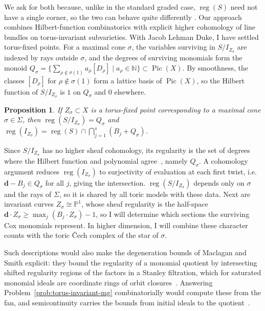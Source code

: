 \documentclass[11pt,reqno]{amsart}
\newtheorem{prop}[lemma]{Proposition}
\theoremstyle{remark}
\newcommand{\reg}{\operatorname{reg}}
\newcommand{\Pic}{\operatorname{Pic}}
\newcommand{\dd}{\mathbf{d}}
\newcommand{\NN}{\mathbb{N}}
\newcommand{\PP}{\mathbb{P}}
\begin{document}
We ask for both because, unlike in the standard graded case, $\reg(S)$ need not have a single corner, so the two can behave quite differently \cite{bruceHellerSayrafi22}. Our approach combines Hilbert-function combinatorics with explicit higher cohomology of line bundles on torus-invariant subvarieties. With Jacob Lehman Duke, I have settled torus-fixed points. For a maximal cone $\sigma$, the variables surviving in $S/I_{Z_\sigma}$ are indexed by rays outside $\sigma$, and the degrees of surviving monomials form the monoid $Q_\sigma=\{\sum_{\rho\notin\sigma(1)}a_\rho[D_\rho]\mid a_\rho\in\NN\}\subset\Pic(X)$. By smoothness, the classes $[D_\rho]$ for $\rho\notin\sigma(1)$ form a lattice basis of $\Pic(X)$, so the Hilbert function of $S/I_{Z_\sigma}$ is $1$ on $Q_\sigma$ and $0$ elsewhere.

\begin{prop}
If $Z_{\sigma} \subset X$ is a torus-fixed point corresponding to a maximal cone $\sigma \in \Sigma$, then $\reg(S/I_{Z_\sigma}) = Q_{\sigma}$ and $\reg(I_{Z_\sigma}) = \reg(S) \cap \bigcap_{j=1}^{s} (B_{j}+Q_{\sigma})$.
\end{prop}

Since $S/I_{Z_{\sigma}}$ has no higher sheaf cohomology, its regularity is the set of degrees where the Hilbert function and polynomial agree~\cite[Prop.~6.4]{maclaganSmith04}, namely $Q_\sigma$. A cohomology argument reduces $\reg(I_{Z_\sigma})$ to surjectivity of evaluation at each first twist, i.e.\ $\dd-B_j\in Q_\sigma$ for all $j$, giving the intersection. $\reg(S/I_{Z_\sigma})$ depends only on $\sigma$ and the rays of $\Sigma$, so it is shared by all toric models with these data. Next are invariant curves $Z_\sigma\cong\PP^1$, whose sheaf regularity is the half-space $\dd\cdot Z_\sigma\ge\max_j(B_j\cdot Z_\sigma)-1$, so I will determine which sections the surviving Cox monomials represent. In higher dimension, I will combine these character counts with the toric \v{C}ech complex of the star of $\sigma$.

Such descriptions would also make the degeneration bounds of Maclagan and Smith explicit: they bound the regularity of a monomial quotient by intersecting shifted regularity regions of the factors in a Stanley filtration, which for saturated monomial ideals are coordinate rings of orbit closures~\cite[Thm.~4.1]{maclaganSmith05}. Answering Problem~\ref{prob:torus-invariant-mg} combinatorially would compute these from the fan, and semicontinuity carries the bounds from initial ideals to the quotient~\cite[Prop.~6.13]{maclaganSmith04}.
\end{document}
